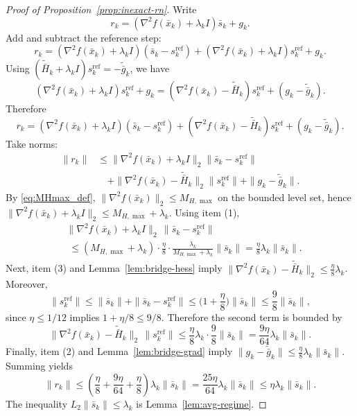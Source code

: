 \documentclass[review,onefignum,onetabnum]{siamart171218}
\begin{document}
\begin{proof}[Proof of Proposition~\ref{prop:inexact-rn}]
Write
\[
r_k=(\nabla^2 f(\bar x_k)+\lambda_k I)\bar s_k+g_k.
\]
Add and subtract the reference step:
\[
r_k=(\nabla^2 f(\bar x_k)+\lambda_k I)(\bar s_k-s_k^{\mathrm{ref}})
+(\nabla^2 f(\bar x_k)+\lambda_k I)s_k^{\mathrm{ref}}+g_k.
\]
Using $(\tilde{\bar H}_k+\lambda_k I)s_k^{\mathrm{ref}}=-\tilde{\bar g}_k$, we have
\[
(\nabla^2 f(\bar x_k)+\lambda_k I)s_k^{\mathrm{ref}}+g_k
=(\nabla^2 f(\bar x_k)-\tilde{\bar H}_k)s_k^{\mathrm{ref}}+(g_k-\tilde{\bar g}_k).
\]
Therefore
\[
r_k=(\nabla^2 f(\bar x_k)+\lambda_k I)(\bar s_k-s_k^{\mathrm{ref}})
+(\nabla^2 f(\bar x_k)-\tilde{\bar H}_k)s_k^{\mathrm{ref}}+(g_k-\tilde{\bar g}_k).
\]
Take norms:
\begin{align*}
\|r_k\|
&\le \|\nabla^2 f(\bar x_k)\!+\!\lambda_k I\|_2\|\bar s_k\!-\!s_k^{\mathrm{ref}}\|\\
&\quad+\|\nabla^2 f(\bar x_k)\!-\!\tilde{\bar H}_k\|_2\|s_k^{\mathrm{ref}}\|
+\|g_k\!-\!\tilde{\bar g}_k\|.
\end{align*}
By \eqref{eq:MHmax_def}, $\|\nabla^2 f(\bar x_k)\|_2\le M_{H,\max}$ on the bounded level set, hence
$\|\nabla^2 f(\bar x_k)+\lambda_k I\|_2\le M_{H,\max}+\lambda_k$.
Using item (1),
\begin{align*}
&\|\nabla^2 f(\bar x_k)\!+\!\lambda_k I\|_2\,\|\bar s_k\!-\!s_k^{\mathrm{ref}}\|\\
&\;\le (M_{H,\max}\!+\!\lambda_k)\!\cdot\!\tfrac{\eta}{8}\!\cdot\!\tfrac{\lambda_k}{M_{H,\max}+\lambda_k}\|\bar s_k\|
=\tfrac{\eta}{8}\lambda_k\|\bar s_k\|.
\end{align*}
Next, item (3) and Lemma~\ref{lem:bridge-hess} imply
$\|\nabla^2 f(\bar x_k)-\tilde{\bar H}_k\|_2\le \frac{\eta}{8}\lambda_k$.
Moreover,
\[
\|s_k^{\mathrm{ref}}\|\le \|\bar s_k\|+\|\bar s_k-s_k^{\mathrm{ref}}\|
\le \Big(1+\frac{\eta}{8}\Big)\|\bar s_k\|\le \frac98\|\bar s_k\|,
\]
since $\eta\le 1/12$ implies $1+\eta/8\le 9/8$.
Therefore the second term is bounded by
\[
\|\nabla^2 f(\bar x_k)-\tilde{\bar H}_k\|_2\,\|s_k^{\mathrm{ref}}\|
\le \frac{\eta}{8}\lambda_k\cdot \frac98\|\bar s_k\|=\frac{9\eta}{64}\lambda_k\|\bar s_k\|.
\]
Finally, item (2) and Lemma~\ref{lem:bridge-grad} imply $\|g_k-\tilde{\bar g}_k\|\le \frac{\eta}{8}\lambda_k\|\bar s_k\|$.
Summing yields
\[
\|r_k\|\le \left(\frac{\eta}{8}+\frac{9\eta}{64}+\frac{\eta}{8}\right)\lambda_k\|\bar s_k\|
=\frac{25\eta}{64}\lambda_k\|\bar s_k\|\le \eta\lambda_k\|\bar s_k\|.
\]
The inequality $L_2\|\bar s_k\|\le \lambda_k$ is Lemma~\ref{lem:avg-regime}.
\end{proof}
\end{document}
